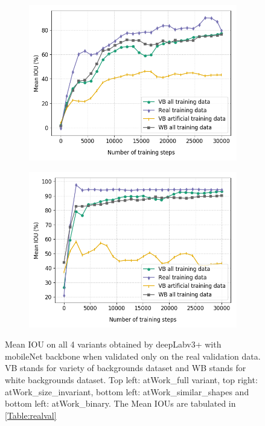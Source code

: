 \begin{figure}[!htb]
\begin{subfigure}{.5\textwidth}
		\end{subfigure}
		\begin{subfigure}{.5\textwidth}
			\centering
			\includegraphics[width=1\linewidth]{images/re_val_mob_shape}
		\end{subfigure}
		\begin{subfigure}{.5\textwidth}
			\centering
			\includegraphics[width=1\linewidth]{images/re_val_mob_binary}
		\end{subfigure}
		\caption{Mean IOU on all 4 variants obtained by deepLabv3+ with mobileNet backbone when validated only on the real validation data. VB stands for variety of backgrounds dataset and WB stands for white backgrounds dataset. Top left: atWork\_full variant, top right: atWork\_size\_invariant, bottom left: atWork\_similar\_shapes and bottom left: atWork\_binary. The Mean IOUs are tabulated in \ref{Table:realval}}
		\label{Fig:realval}
	\end{figure}


